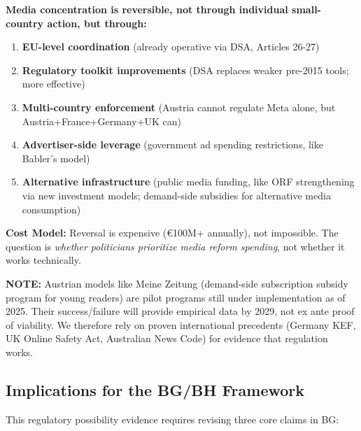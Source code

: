 \begin{tcolorbox}[colback=green!5!white, colframe=green!75!black,
    title=Alternative Hypothesis (Regulatory Possibility)]

\textbf{Media concentration is reversible, not through individual small-country action, but through:}

\begin{enumerate}
\item \textbf{EU-level coordination} (already operative via DSA, Articles 26-27)
\item \textbf{Regulatory toolkit improvements} (DSA replaces weaker pre-2015 tools; more effective)
\item \textbf{Multi-country enforcement} (Austria cannot regulate Meta alone, but Austria+France+Germany+UK can)
\item \textbf{Advertiser-side leverage} (government ad spending restrictions, like Babler's model)
\item \textbf{Alternative infrastructure} (public media funding, like ORF strengthening via new investment models; demand-side subsidies for alternative media consumption)
\end{enumerate}

\textbf{Cost Model:} Reversal is expensive (€100M+ annually), not impossible. The question is \textit{whether politicians prioritize media reform spending}, not whether it works technically.

\textbf{NOTE:} Austrian models like Meine Zeitung (demand-side subscription subsidy program for young readers) are pilot programs still under implementation as of 2025. Their success/failure will provide empirical data by 2029, not ex ante proof of viability. We therefore rely on proven international precedents (Germany KEF, UK Online Safety Act, Australian News Code) for evidence that regulation works.

\end{tcolorbox}

\subsection*{Implications for the BG/BH Framework}

This regulatory possibility evidence requires revising three core claims in BG:

